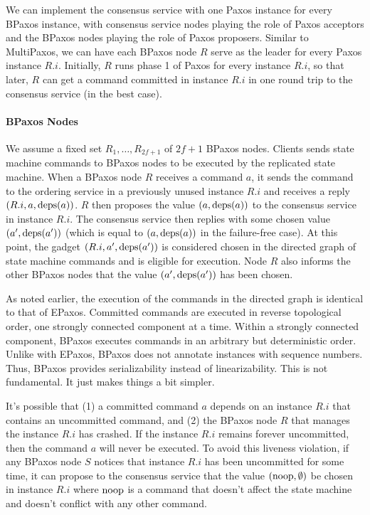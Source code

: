 We can implement the consensus service with one Paxos instance for every BPaxos
instance, with consensus service nodes playing the role of Paxos acceptors and
the BPaxos nodes playing the role of Paxos proposers. Similar to MultiPaxos, we
can have each BPaxos node $R$ serve as the leader for every Paxos instance
$R.i$. Initially, $R$ runs phase 1 of Paxos for every instance $R.i$, so that
later, $R$ can get a command committed in instance $R.i$ in one round trip to
the consensus service (in the best case).

\paragraph{BPaxos Nodes}
We assume a fixed set $R_1, \ldots, R_{2f+1}$ of $2f + 1$ BPaxos nodes.
%
Clients sends state machine commands to BPaxos nodes to be executed by the
replicated state machine. When a BPaxos node $R$ receives a command $a$, it
sends the command to the ordering service in a previously unused instance $R.i$
and receives a reply $(R.i, a, \text{deps}(a))$. $R$ then proposes the value $(a,
\text{deps}(a))$ to the consensus service in instance $R.i$. The consensus service
then replies with some chosen value $(a', \text{deps}(a'))$ (which is equal to $(a,
\text{deps}(a))$ in the failure-free case). At this point, the gadget $(R.i, a',
\text{deps}(a'))$ is considered chosen in the directed graph of state machine
commands and is eligible for execution. Node $R$ also informs the other BPaxos
nodes that the value $(a', \text{deps}(a'))$ has been chosen.

As noted earlier, the execution of the commands in the directed graph is
identical to that of EPaxos. Committed commands are executed in reverse
topological order, one strongly connected component at a time. Within a
strongly connected component, BPaxos executes commands in an arbitrary but
deterministic order. Unlike with EPaxos, BPaxos does not annotate instances
with sequence numbers. Thus, BPaxos provides serializability instead of
linearizability. This is not fundamental. It just makes things a bit simpler.

It's possible that (1) a committed command $a$ depends on an instance $R.i$
that contains an uncommitted command, and (2) the BPaxos node $R$ that manages
the instance $R.i$ has crashed. If the instance $R.i$ remains forever
uncommitted, then the command $a$ will never be executed. To avoid this
liveness violation, if any BPaxos node $S$ notices that instance $R.i$ has been
uncommitted for some time, it can propose to the consensus service that the
value $(\text{noop}, \emptyset)$ be chosen in instance $R.i$ where $\text{noop}$ is a
command that doesn't affect the state machine and doesn't conflict with any
other command.

